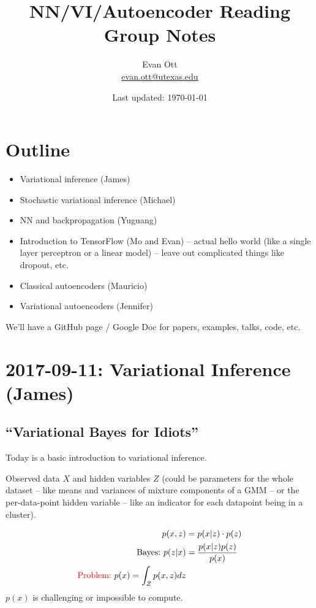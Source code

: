 \documentclass{article}
\title{\vspace{-6ex}NN/VI/Autoencoder Reading Group Notes\vspace{-2ex}} lorem
\author{Evan Ott \\ \href{mailto:evan.ott@utexas.edu}{evan.ott@utexas.edu}\vspace{-2ex}}
\date{Last updated: \today}
\begin{document}
\maketitle

\section{Outline}
\begin{itemize}
  \item Variational inference (James)
  \item Stochastic variational inference (Michael)
  \item NN and backpropagation (Yuguang)
  \item Introduction to TensorFlow (Mo and Evan) -- actual hello world (like a single layer perceptron or a linear model) -- leave out complicated things like dropout, etc.
  \item Classical autoencoders (Mauricio)
  \item Variational autoencoders (Jennifer)
\end{itemize}

We'll have a GitHub page / Google Doc for papers, examples, talks, code, etc.

\section{2017-09-11: Variational Inference (James)}
\subsection{``Variational Bayes for Idiots''}
Today is a basic introduction to variational inference.

Observed data $X$ and hidden variables $Z$ (could be parameters for the whole dataset
-- like means and variances of mixture components of a GMM -- or the per-data-point hidden variable -- like an indicator
for each datapoint being in a cluster).

\begin{align*}
  p(x,z)&= p(x|z)\cdot p(z)
  \\
  \textrm{Bayes:~} p(z|x)&=\frac{p(x|z)p(z)}{p(x)}
  \\
  \textrm{\color{red}Problem:~\color{black}} p(x)=\int_Z p(x,z)dz
\end{align*}
$p(x)$ is challenging or impossible to compute.
\end{document}
